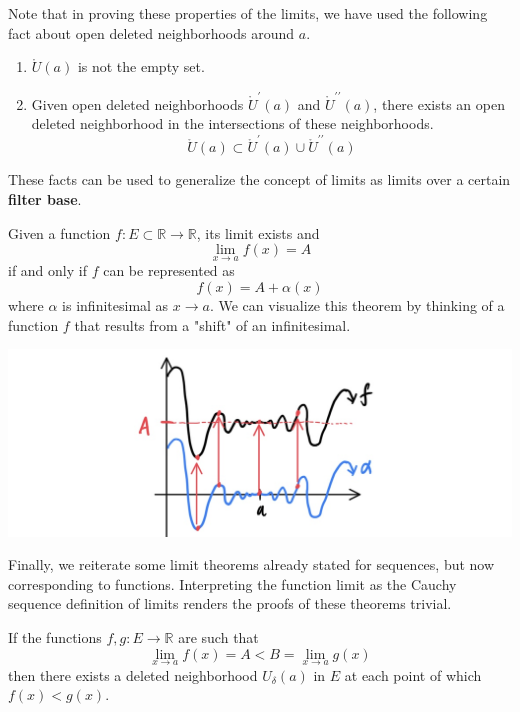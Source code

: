 \documentclass{article}
\begin{document}
    Note that in proving these properties of the limits, we have used the following fact about open deleted neighborhoods around $a$. 
    \begin{enumerate}
      \item $\mathring{U} (a)$ is not the empty set. 
      \item Given open deleted neighborhoods $\mathring{U}^\prime (a)$ and $\mathring{U}^{\prime\prime} (a)$, there exists an open deleted neighborhood in the intersections of these neighborhoods. 
      \[\mathring{U} (a) \subset \mathring{U}^\prime (a) \cup \mathring{U}^{\prime\prime} (a)\]
    \end{enumerate}
    These facts can be used to generalize the concept of limits as limits over a certain \textbf{filter base}. 

    \begin{theorem}
    Given a function $f: E \subset \mathbb{R} \longrightarrow \mathbb{R}$, its limit exists and 
    \[\lim_{x \rightarrow a} f(x) = A\]
    if and only if $f$ can be represented as 
    \[f(x) = A + \alpha (x)\]
    where $\alpha$ is infinitesimal as $x \rightarrow a$. We can visualize this theorem by thinking of a function $f$ that results from a "shift" of an infinitesimal. 
    \begin{center}
        \includegraphics[scale=0.3]{img/Infinitesimal_Shift_Function.jpg}
    \end{center}
    \end{theorem}

    Finally, we reiterate some limit theorems already stated for sequences, but now corresponding to functions. Interpreting the function limit as the Cauchy sequence definition of limits renders the proofs of these theorems trivial. 

    \begin{theorem}
    If the functions $f, g: E \rightarrow \mathbb{R}$ are such that
    \[\lim_{x\rightarrow a} f(x) = A < B = \lim_{x \rightarrow a} g(x)\]
    then there exists a deleted neighborhood $U_\delta (a)$ in $E$ at each point of which $f(x) < g(x)$. 
    \end{theorem}
\end{document}
